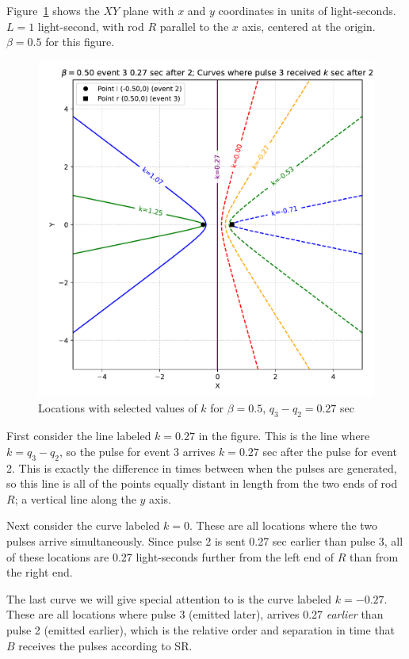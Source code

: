 \documentclass[a4paper]{article}
\theoremstyle{plain}
\theoremstyle{definition}
\begin{document}
Figure~\ref{fig:pulse-receive-deltas-L-1.0-beta-0.50} shows the $XY$
plane with $x$ and $y$ coordinates in units of light-seconds.  $L=1$
light-second, with rod $R$ parallel to the $x$ axis, centered at the
origin.  $\beta=0.5$ for this figure.
\begin{figure}[ht]
	\centering
	\includegraphics[width=1.0\textwidth]{pulse-receive-deltas-L-1.0-beta-0.50-cropped.pdf}
	\caption{Locations with selected values of $k$ for $\beta=0.5$, $q_3 - q_2 = 0.27$ sec}
	\label{fig:pulse-receive-deltas-L-1.0-beta-0.50}
\end{figure}
First consider the line labeled $k=0.27$ in the figure.  This is the
line where $k = q_3 - q_2$, so the pulse for event 3 arrives $k=0.27$
sec after the pulse for event 2.  This is exactly the difference in
times between when the pulses are generated, so this line is all of
the points equally distant in length from the two ends of rod $R$; a
vertical line along the $y$ axis.

Next consider the curve labeled $k=0$.  These are all locations where
the two pulses arrive simultaneously.  Since pulse 2 is sent 0.27 sec
earlier than pulse 3, all of these locations are 0.27 light-seconds
further from the left end of $R$ than from the right end.

The last curve we will give special attention to is the curve labeled
$k=-0.27$.  These are all locations where pulse 3 (emitted later),
arrives 0.27 {\em earlier} than pulse 2 (emitted earlier), which is
the relative order and separation in time that $B$ receives the pulses
according to SR.
\end{document}
